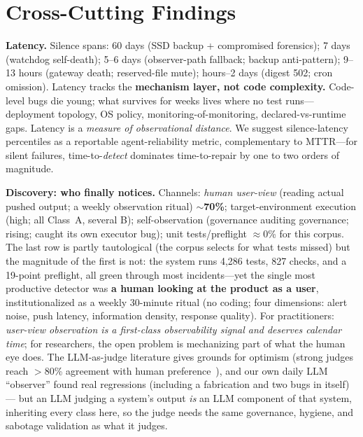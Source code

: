 \documentclass[conference]{IEEEtran}
\begin{document}
\section{Cross-Cutting Findings}\label{sec:findings}
\textbf{Latency.} Silence spans: 60 days (SSD backup + compromised
forensics); 7 days (watchdog self-death); 5--6 days (observer-path
fallback; backup anti-pattern); 9--13 hours (gateway death; reserved-file
mute); hours--2 days (digest 502; cron omission). Latency tracks the
\textbf{mechanism layer, not code complexity.} Code-level bugs die young;
what survives for weeks lives where no test runs---deployment topology, OS
policy, monitoring-of-monitoring, declared-vs-runtime gaps. Latency is a
\emph{measure of observational distance}. We suggest silence-latency
percentiles as a reportable agent-reliability metric, complementary to
MTTR---for silent failures, time-to-\emph{detect} dominates
time-to-repair by one to two orders of magnitude.

\textbf{Discovery: who finally notices.}\label{sec:discovery} Channels:
\emph{human user-view} (reading actual pushed output; a weekly observation
ritual) \textbf{$\sim$70\%}; target-environment execution (high; all
Class~A, several B); self-observation (governance auditing governance;
rising; caught its own executor bug); unit tests/preflight $\approx$0\%
for this corpus. The last row is partly tautological (the corpus selects
for what tests missed) but the magnitude of the first is not: the system
runs 4{,}286 tests, 827 checks, and a 19-point preflight, all green
through most incidents---yet the single most productive detector was
\textbf{a human looking at the product as a user}, institutionalized as a
weekly 30-minute ritual (no coding; four dimensions: alert noise, push
latency, information density, response quality). For practitioners:
\emph{user-view observation is a first-class observability signal and
deserves calendar time}; for researchers, the open problem is mechanizing
part of what the human eye does. The LLM-as-judge literature gives grounds
for optimism (strong judges reach $>$80\% agreement with human
preference~\cite{zheng2023judge}), and our own daily LLM ``observer''
found real regressions (including a fabrication and two bugs in itself)---
but an LLM judging a system's output \emph{is} an LLM component of that
system, inheriting every class here, so the judge needs the same
governance, hygiene, and sabotage validation as what it judges.
\end{document}
